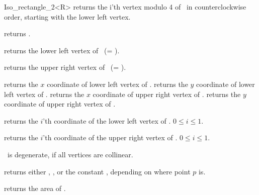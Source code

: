 \begin{ccRefClass} {Iso_rectangle_2<R>}
       {returns the i'th vertex modulo 4  of \ccVar\ in counterclockwise order, 
        starting with the lower left vertex.}

       {returns  .}

       {returns the lower left vertex of \ccVar\ (= ).}


       {returns the upper right vertex of \ccVar\ (= ).}

       {returns the $x$ coordinate of lower left vertex of \ccVar.}
\ccGlue
{}
       {returns the $y$ coordinate of lower left vertex of \ccVar.}
\ccGlue
{}
       {returns the $x$ coordinate of upper right vertex of \ccVar.}
\ccGlue
{}
       {returns the $y$ coordinate of upper right vertex of \ccVar.}

       {returns the $i$'th  coordinate of the
        lower left vertex of \ccVar. 
        \ccPrecond $0 \leq i \leq 1$.}

       {returns the $i$'th  coordinate of the
        upper right vertex of \ccVar. 
        \ccPrecond $0 \leq i \leq 1$.}

\ccPredicates

       {%
        \ccVar\ is degenerate, if all vertices
        are collinear.}

       {returns either ,
        , or the constant
        , 
        depending on where point $p$ is.}

       {}
\ccGlue
{}
       {}
\ccGlue
{}
       {}


       {returns the area of \ccVar. }


\end{ccRefClass}
